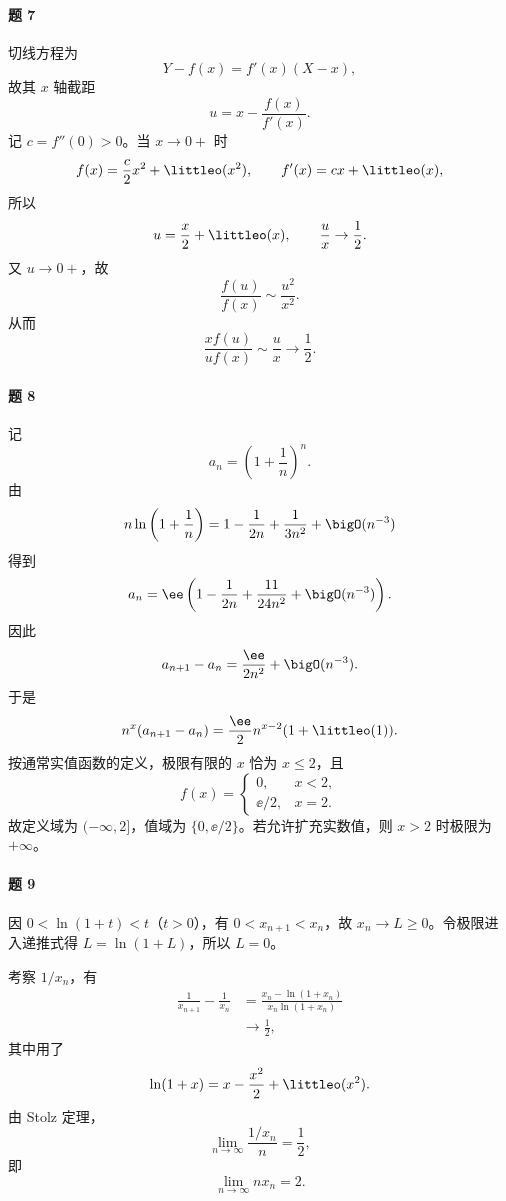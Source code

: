\paragraph{题 7}
\begin{xsolution}
切线方程为
\[
  Y-f(x)=f'(x)(X-x),
\]
故其 $x$ 轴截距
\[
  u=x-\frac{f(x)}{f'(x)}.
\]
记 $c=f''(0)>0$。当 $x\to0+$ 时
\[
  f(x)=\frac c2x^2+\littleo(x^2),\qquad
  f'(x)=cx+\littleo(x),
\]
所以
\[
  u=\frac x2+\littleo(x),\qquad \frac ux\to\frac12.
\]
又 $u\to0+$，故
\[
  \frac{f(u)}{f(x)}\sim\frac{u^2}{x^2}.
\]
从而
\[
  \frac{x f(u)}{u f(x)}\sim\frac ux\to\frac12.
\]
\end{xsolution}

\paragraph{题 8}
\begin{xsolution}
记
\[
  a_n=\left(1+\frac1n\right)^n.
\]
由
\[
  n\ln\left(1+\frac1n\right)
  =1-\frac1{2n}+\frac1{3n^2}+\bigO(n^{-3})
\]
得到
\[
  a_n=\ee\left(1-\frac1{2n}+\frac{11}{24n^2}+\bigO(n^{-3})\right).
\]
因此
\[
  a_{n+1}-a_n=\frac{\ee}{2n^2}+\bigO(n^{-3}).
\]
于是
\[
  n^x(a_{n+1}-a_n)
  =\frac\ee2 n^{x-2}(1+\littleo(1)).
\]
按通常实值函数的定义，极限有限的 $x$ 恰为 $x\le2$，且
\[
  f(x)=
  \begin{cases}
    0,&x<2,\\
    \ee/2,&x=2.
  \end{cases}
\]
故定义域为 $(-\infty,2]$，值域为 $\{0,\ee/2\}$。若允许扩充实数值，则 $x>2$ 时极限为 $+\infty$。
\end{xsolution}

\paragraph{题 9}
\begin{xsolution}
因 $0<\ln(1+t)<t$（$t>0$），有 $0<x_{n+1}<x_n$，故 $x_n\to L\ge0$。令极限进入递推式得 $L=\ln(1+L)$，所以 $L=0$。

考察 $1/x_n$，有
\begin{align*}
  \frac1{x_{n+1}}-\frac1{x_n}
  &=\frac{x_n-\ln(1+x_n)}{x_n\ln(1+x_n)}\\
  &\to\frac12,
\end{align*}
其中用了
\[
  \ln(1+x)=x-\frac{x^2}{2}+\littleo(x^2).
\]
由 Stolz 定理，
\[
  \lim_{n\to\infty}\frac{1/x_n}{n}=\frac12,
\]
即
\[
  \boxed{\lim_{n\to\infty}nx_n=2}.
\]
\end{xsolution}

